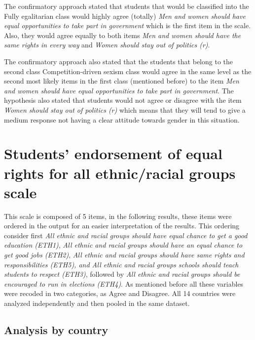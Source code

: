 \documentclass[12pt,a4paper,oneside]{reedthesis}
\begin{document}
The confirmatory approach stated that students that would be classified into the Fully egalitarian class would highly agree (totally) \emph{Men and women should have equal opportunities to take part in government} which is the first item in the scale. Also, they would agree equally to both items \emph{Men and women should have the same rights in every way} and \emph{Women should stay out of politics (r)}.

The confirmatory approach also stated that the students that belong to the second class Competition-driven sexism class would agree in the same level as the second most likely items in the first class (mentioned before) to the item \emph{Men and women should have equal opportunities to take part in government}. The hypothesis also stated that students would not agree or disagree with the item \emph{Women should stay out of politics (r)} which means that they will tend to give a medium response not having a clear attitude towards gender in this situation.

\hypertarget{students-endorsement-of-equal-rights-for-all-ethnicracial-groups-scale}{%
\section{Students' endorsement of equal rights for all ethnic/racial groups scale}\label{students-endorsement-of-equal-rights-for-all-ethnicracial-groups-scale}}

This scale is composed of 5 items, in the following results, these items were ordered in the output for an easier interpretation of the results. This ordering consider first \emph{All ethnic and racial groups should have equal chance to get a good education (ETH1)}, \emph{All ethnic and racial groups should have an equal chance to get good jobs (ETH2)}, \emph{All ethnic and racial groups should have same rights and responsibilities (ETH5), and All ethnic and racial groups schools should teach students to respect (ETH3)}, followed by \emph{All ethnic and racial groups should be encouraged to run in elections (ETH4)}. As mentioned before all these variables were recoded in two categories, as Agree and Disagree. All 14 countries were analyzed independently and then pooled in the same dataset.

\hypertarget{analysis-by-country-1}{%
\subsection{Analysis by country}\label{analysis-by-country-1}}
\end{document}
